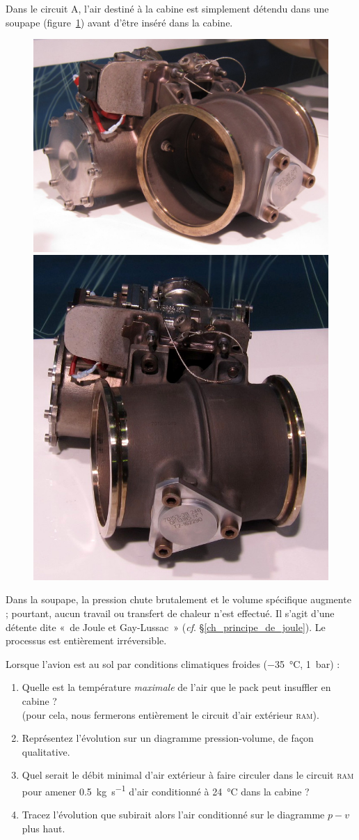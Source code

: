 	Dans le circuit A, l’air destiné à la cabine est simplement détendu dans une soupape (figure~\ref{fig_soupape}) avant d’être inséré dans la cabine.

	\begin{figure}
		\begin{center}
			\includegraphics[height=.2\textwidth]{images/outflow_valve_1.jpg}
			\includegraphics[height=.2\textwidth]{images/outflow_valve_2.jpg}
		\end{center}
		\label{fig_soupape}
	\end{figure}
	
	Dans la soupape, la pression chute brutalement et le volume spécifique augmente ; pourtant, aucun travail ou transfert de chaleur n’est effectué. Il s’agit d’une détente dite «~de Joule et Gay-Lussac~» (\textit{cf}. \S\ref{ch_principe_de_joule}). Le processus est entièrement irréversible.
	
	Lorsque l’avion est au sol par conditions climatiques froides (\SI{-35}{\degreeCelsius}, \SI{1}{\bar}) :
	
	\begin{enumerate}
		\item Quelle est la température \emph{maximale} de l’air que le pack peut insuffler en cabine ?\\
			(pour cela, nous fermerons entièrement le circuit d’air extérieur \textsc{ram}).
		\item Représentez l’évolution sur un diagramme pression-volume, de façon qualitative.
		\item Quel serait le débit minimal d’air extérieur à faire circuler dans le circuit \textsc{ram} pour amener \SI[per-mode=symbol]{0,5}{\kilogram\per\second} d’air conditionné à \SI{24}{\degreeCelsius} dans la cabine ?
		\item Tracez l’évolution que subirait alors l’air conditionné sur le diagramme $p-v$ plus haut.
	\end{enumerate}


